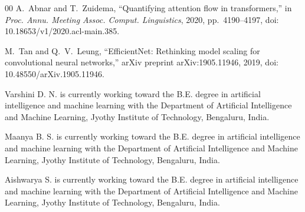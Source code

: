 \begin{thebibliography}{00}
 A.~Abnar and T.~Zuidema, ``Quantifying attention flow in
transformers,'' in \emph{Proc. Annu. Meeting Assoc. Comput. Linguistics}, 2020,
pp.~4190--4197, doi: 10.18653/v1/2020.acl-main.385.

 M.~Tan and Q.~V.~Leung, ``EfficientNet: Rethinking model scaling for
convolutional neural networks,'' arXiv preprint arXiv:1905.11946, 2019,
doi: 10.48550/arXiv.1905.11946.

\end{thebibliography}


\begin{IEEEbiographynophoto}{Varshini D. N.} is currently working toward the
B.E. degree in artificial intelligence and machine learning with the Department
of Artificial Intelligence and Machine Learning, Jyothy Institute of Technology,
Bengaluru, India.
\end{IEEEbiographynophoto}

\begin{IEEEbiographynophoto}{Maanya B. S.} is currently working toward the
B.E. degree in artificial intelligence and machine learning with the Department
of Artificial Intelligence and Machine Learning, Jyothy Institute of Technology,
Bengaluru, India.
\end{IEEEbiographynophoto}

\begin{IEEEbiographynophoto}{Aishwarya S.} is currently working toward the
B.E. degree in artificial intelligence and machine learning with the Department
of Artificial Intelligence and Machine Learning, Jyothy Institute of Technology,
Bengaluru, India.
\end{IEEEbiographynophoto}

\EOD

